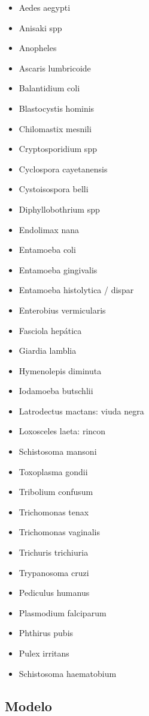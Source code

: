 \documentclass[letter,12pt]{report}
\begin{document}
\begin{itemize}
    \item Aedes aegypti
    \item Anisaki spp
    \item Anopheles
    \item Ascaris lumbricoide
    \item Balantidium coli
    \item Blastocystis hominis
    \item Chilomastix mesnili
    \item Cryptosporidium spp
    \item Cyclospora cayetanensis
    \item Cystoisospora belli
    \item Diphyllobothrium spp
    \item Endolimax nana
    \item Entamoeba coli
    \item Entamoeba gingivalis
    \item Entamoeba histolytica / dispar
    \item Enterobius vermicularis
    \item Fasciola hepática
    \item Giardia lamblia
    \item Hymenolepis diminuta
    \item Iodamoeba butschlii
    \item Latrodectus mactans: viuda negra
    \item Loxosceles laeta: rincon
    \item Schistosoma mansoni
    \item Toxoplasma gondii
    \item Tribolium confusum
    \item Trichomonas tenax
    \item Trichomonas vaginalis
    \item Trichuris trichiuria
    \item Trypanosoma cruzi
    \item Pediculus humanus
    \item Plasmodium falciparum
    \item Phthirus pubis
    \item Pulex irritans
    \item Schistosoma haematobium
\end{itemize}

\subsection{Modelo}
\end{document}

